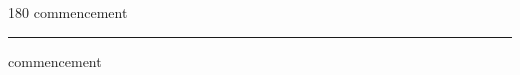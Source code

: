 
\begin{frame}
\begin{center}
\begin{turn}{180}
{\fontsize{2.5cm}{1em}\selectfont commencement}
\end{turn}
\vspace{1em}\par  
\hrule
\vspace{1em}\par  
{\fontsize{2.5cm}{1em}\selectfont commencement}
\end{center}
\end{frame}

